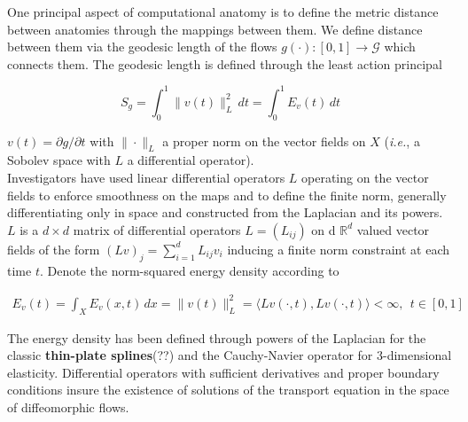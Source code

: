\documentclass[preprint,review,8pt,times]{elsarticle}
\newcommand{\CA}{computational anatomy}
\begin{document}


One principal aspect of \CA{} is to define the metric distance between anatomies through the mappings between them. We define distance between them via the geodesic length of the flows $g(\cdot): [0, 1] \rightarrow \mathcal{G}$ which connects them. The geodesic length is defined through the least action principal 

$$
S_{g} = \int_{0}^{1} \|v(t)\|_{L}^{2} \,dt = \int_{0}^{1} E_{v}(t) \,dt
$$ 

$v(t) = \partial g/ \partial t$ with $\| \cdot \|_{L}$ a proper norm on the vector fields on $X$ ({\it i.e.}, a Sobolev space with $L$ a differential operator). \\

Investigators have used linear differential operators $L$ operating on the vector fields to enforce smoothness on the maps and to define the finite norm, generally differentiating only in space and constructed from the Laplacian and its powers. $L$ is a $d \times d$ matrix of differential operators $L = (L_{ij})$ on d $\mathbb{R}^{d}$ valued vector fields of the form $(Lv)_{j} = \sum_{i = 1}^{d} L_{ij}v_{i}$ inducing a finite norm constraint at each time $t$. Denote the norm-squared energy density according to 

\begin{eqnarray}
 E_{v}(t) = \int_{X}E_{v}(x,t) \, dx = \| v(t)\|_{L}^{2} = \langle Lv(\cdot, t), Lv(\cdot, t) \rangle < \infty, ~~t \in [0,1]
\label{EnergyDensity}
\end{eqnarray}

The energy density has been defined through powers of the Laplacian for the classic {\bf thin-plate splines}(??) and the Cauchy-Navier operator for 3-dimensional elasticity. Differential operators with sufficient derivatives and proper boundary conditions insure the existence of solutions of the transport equation in the space of diffeomorphic flows.\\
\end{document}
